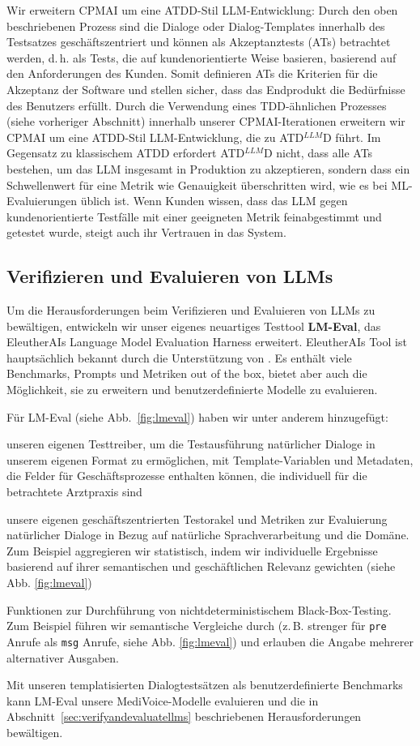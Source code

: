 \documentclass[twocolumn]{article}
\newcommand{\ATDLLMD}{ATD$^{LLM}$D}%
\begin{document}
Wir erweitern CPMAI um eine ATDD-Stil LLM-Entwicklung: Durch den oben beschriebenen Prozess sind die Dialoge oder Dialog-Templates innerhalb des Testsatzes geschäftszentriert und können als Akzeptanztests (ATs) betrachtet werden, d.\,h. als Tests, die auf kundenorientierte Weise basieren, basierend auf den Anforderungen des Kunden. Somit definieren ATs die Kriterien für die Akzeptanz der Software und stellen sicher, dass das Endprodukt die Bedürfnisse des Benutzers erfüllt. Durch die Verwendung eines TDD-ähnlichen Prozesses (siehe vorheriger Abschnitt) innerhalb unserer CPMAI-Iterationen erweitern wir CPMAI um eine ATDD-Stil LLM-Entwicklung, die zu \ATDLLMD{} führt. Im Gegensatz zu klassischem ATDD erfordert \ATDLLMD{} nicht, dass alle ATs bestehen, um das LLM insgesamt in Produktion zu akzeptieren, sondern dass ein Schwellenwert für eine Metrik wie Genauigkeit überschritten wird, wie es bei ML-Evaluierungen üblich ist. Wenn Kunden wissen, dass das LLM gegen kundenorientierte Testfälle mit einer geeigneten Metrik feinabgestimmt und getestet wurde, steigt auch ihr Vertrauen in das System.

\subsection{Verifizieren und Evaluieren von LLMs}

Um die Herausforderungen beim Verifizieren und Evaluieren von LLMs zu bewältigen, entwickeln wir unser eigenes neuartiges Testtool \textbf{LM-Eval}, das EleutherAIs Language Model Evaluation Harness \cite{Gao23} erweitert. EleutherAIs Tool ist hauptsächlich bekannt durch die Unterstützung von \cite{HF24}. Es enthält viele Benchmarks, Prompts und Metriken out of the box, bietet aber auch die Möglichkeit, sie zu erweitern und benutzerdefinierte Modelle zu evaluieren.

Für LM-Eval (siehe Abb.~\ref{fig:lmeval}) haben wir unter anderem hinzugefügt:
\begin{compactitem}
\item unseren eigenen Testtreiber, um die Testausführung natürlicher Dialoge in unserem eigenen Format zu ermöglichen, mit Template-Variablen und Metadaten, die Felder für Geschäftsprozesse enthalten können, die individuell für die betrachtete Arztpraxis sind
\item unsere eigenen geschäftszentrierten Testorakel und Metriken zur Evaluierung natürlicher Dialoge in Bezug auf natürliche Sprachverarbeitung und die Domäne. Zum Beispiel aggregieren wir statistisch, indem wir individuelle Ergebnisse basierend auf ihrer semantischen und geschäftlichen Relevanz gewichten (siehe Abb. \ref{fig:lmeval})
\item Funktionen zur Durchführung von nichtdeterministischem Black-Box-Testing. Zum Beispiel führen wir semantische Vergleiche durch (z.\,B. strenger für \texttt{pre} Anrufe als \texttt{msg} Anrufe, siehe Abb. \ref{fig:lmeval}) und erlauben die Angabe mehrerer alternativer Ausgaben.
\end{compactitem}
Mit unseren templatisierten Dialogtestsätzen als benutzerdefinierte Benchmarks kann LM-Eval unsere MediVoice-Modelle evaluieren und die in Abschnitt~\ref{sec:verifyandevaluatellms} beschriebenen Herausforderungen bewältigen.
\end{document}

